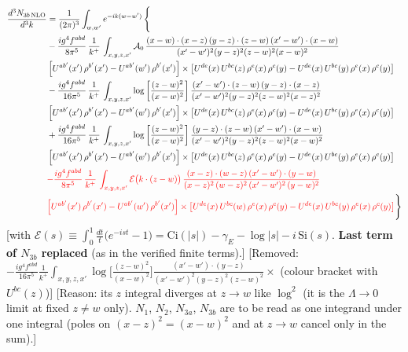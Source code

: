 \documentclass[9pt]{article}
\numberwithin{equation}{section}
\begin{document}
\begin{align}
\frac{d^{3}N_{3b\,\rm NLO}}{d^{3}k} & = \frac{1}{(2\pi)^{3}}\int_{w,w'}e^{-ik(w-w')}\,\Bigg\{\notag \\
&-\frac{ig^{4}f^{abd}}{8\pi^{5}}\,\frac{1}{k^{+}}\,\int_{x,y,z,x'}\mathcal{A}_{0}\,
\frac{(x-w)\cdot(x-z)\,(y-z)\cdot(z-w)\,(x'-w')\cdot(x-w)}{(x'-w')^{2}(y-z)^{2}(z-w)^{2}(x-w)^{2}}\notag \\ & \left[U^{ab'}(x')\,\rho^{b'}(x')-U^{ab'}(w')\, \rho^{b'}(x')\right]\times \left[U^{de}(x)\,U^{bc}(z)\, \rho^{e}(x)\,\rho^{c}(y)-U^{de}(x)\,U^{bc}(y)\,\rho^{e}(x)\,\rho^{c}(y)\right] \notag \\
& -\frac{ig^{4}f^{abd}}{16\pi^{5}}\,\frac{1}{k^{+}}\,\int_{x,y,z,x'}\log{\left[\frac{(z-w)^{2}}{(x-w)^{2}}\right]}\,
\frac{(x'-w')\cdot(z-w)\,(y-z)\cdot(x-z)}{(x'-w')^{2}(y-z)^{2}(z-w)^{2}(x-z)^{2}}\notag \\
&\left[U^{ab'}(x')\,\rho^{b'}(x')-U^{ab'}(w')\, \rho^{b'}(x')\right]\times \left[U^{de}(x)\,U^{bc}(z)\, \rho^{e}(x)\,\rho^{c}(y)-U^{de}(x)\,U^{bc}(y)\,\rho^{e}(x)\,\rho^{c}(y)\right] \notag \\
&+ \frac{ig^{4}f^{abd}}{16\pi^{5}}\,\frac{1}{k^{+}}\,\int_{x,y,z,x'}\log{\left[\frac{(z-w)^{2}}{(x-w)^{2}}\right]}\,
\frac{(y-z)\cdot(z-w)\,(x'-w')\cdot(x-w)}{(x'-w')^{2}(y-z)^{2}(z-w)^{2}(x-w)^{2}}\notag \\ 
& \left[U^{ab'}(x')\,\rho^{b'}(x')-U^{ab'}(w')\, \rho^{b'}(x')\right]\times \left[U^{de}(x)\,U^{bc}(z)\, \rho^{e}(x)\,\rho^{c}(y)-U^{de}(x)\,U^{bc}(y)\,\rho^{e}(x)\,\rho^{c}(y)\right]\notag \\ &  {\color{red}-\frac{ig^{4}f^{abd}}{8\pi^{5}}\,\frac{1}{k^{+}}\,\int_{x,y,z,x'}\mathcal{E}\big(k\cdot(z-w)\big)\,\frac{(x-z)\cdot(w-z)\,(x'-w')\cdot(y-w)}{(x-z)^{2}\,(w-z)^{2}\,(x'-w')^{2}\,(y-w)^{2}}}\notag \\ & {\color{red}\left[U^{ab'}(x')\,\rho^{b'}(x')-U^{ab'}(w')\, \rho^{b'}(x')\right]\times \left[U^{de}(x)\,U^{bc}(w)\, \rho^{e}(x)\,\rho^{c}(y)-U^{de}(x)\,U^{bc}(y)\,\rho^{e}(x)\,\rho^{c}(y)\right]}\Bigg\}
\end{align} {\color{red}[with $\mathcal{E}(s)\equiv\int_{0}^{1}\frac{dt}{t}\big(e^{-ist}-1\big)=\mathrm{Ci}(|s|)-\gamma_{E}-\log|s|-i\,\mathrm{Si}(s)$. \textbf{Last term of $N_{3b}$ replaced} (as in the verified finite terms).]} {\color{orange}[Removed: $-\frac{ig^{4}f^{abd}}{16\pi^{5}}\frac{1}{k^{+}}\int_{x,y,z,x'}\log\big[\frac{(z-w)^{2}}{(x-w)^{2}}\big]\frac{(x'-w')\cdot(y-z)}{(x'-w')^{2}(y-z)^{2}(z-w)^{2}}\times$ (colour bracket with $U^{bc}(z)$)]} {\color{red}[Reason: its $z$ integral diverges at $z\to w$ like $\log^{2}$ (it is the $\Lambda\to0$ limit at fixed $z\neq w$ only). $N_{1}$, $N_{2}$, $N_{3a}$, $N_{3b}$ are to be read as one integrand under one integral (poles on $(x-z)^{2}=(x-w)^{2}$ and at $z\to w$ cancel only in the sum).]}\par\noindent
\end{document}
